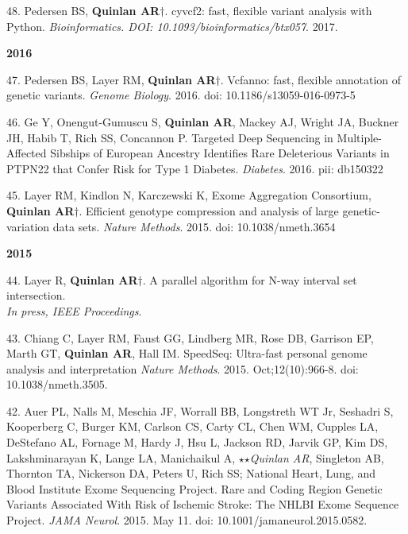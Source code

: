 \documentclass[margin,line]{cv}
\begin{document}
\begin{resume}
\begin{list}{*}{}
    \item[48.] Pedersen BS, \textbf{Quinlan AR}$\dagger$.
    cyvcf2: fast, flexible variant analysis with Python. \emph{Bioinformatics. DOI: 10.1093/bioinformatics/btx057}. 2017. 

    \end{list}


    \textbf{2016} \\

    \begin{list}{*}{}

    \item[47.] Pedersen BS, Layer RM, \textbf{Quinlan AR}$\dagger$.
    Vcfanno: fast, flexible annotation of genetic variants. \emph{Genome Biology}. 2016. doi: 10.1186/s13059-016-0973-5

    \item[46.] Ge Y, Onengut-Gumuscu S, \textbf{Quinlan AR}, Mackey AJ, Wright JA, Buckner JH, Habib T, Rich SS, Concannon P.
    Targeted Deep Sequencing in Multiple-Affected Sibships of European Ancestry Identifies Rare Deleterious Variants in PTPN22 that Confer Risk for Type 1 Diabetes. \emph{Diabetes}. 2016. pii: db150322

    \item[45.] Layer RM, Kindlon N, Karczewski K, Exome Aggregation Consortium, \textbf{Quinlan AR}$\dagger$.
    Efficient genotype compression and analysis of large genetic-variation data sets.
    \emph{Nature Methods}. 2015. doi: 10.1038/nmeth.3654

    \end{list}
    

    \textbf{2015} \\

    \begin{list}{*}{}

    \item[44.] Layer R, \textbf{Quinlan AR}$\dagger$.
    A parallel algorithm for N-way interval set intersection.\\
    \emph{In press, IEEE Proceedings}.

    \item[43.] Chiang C, Layer RM, Faust GG, Lindberg MR, Rose DB, Garrison EP, Marth GT, \textbf{Quinlan AR}, Hall IM.
    SpeedSeq: Ultra-fast personal genome analysis and interpretation
    \emph{Nature Methods}. 2015. Oct;12(10):966-8. doi: 10.1038/nmeth.3505.

    \item[42.] Auer PL, Nalls M, Meschia JF, Worrall BB, Longstreth WT Jr, Seshadri S, Kooperberg C, Burger KM, Carlson CS,
    Carty CL, Chen WM, Cupples LA, DeStefano AL, Fornage M, Hardy J, Hsu L, Jackson RD, Jarvik GP, Kim DS,
    Lakshminarayan K, Lange LA, Manichaikul A,  $\star$$\star$\textit{Quinlan AR}, Singleton AB, Thornton TA,
    Nickerson DA, Peters U, Rich SS; National Heart, Lung, and Blood Institute Exome Sequencing Project.
    Rare and Coding Region Genetic Variants Associated With Risk of Ischemic Stroke: The NHLBI Exome Sequence Project.
    \emph{JAMA Neurol}. 2015. May 11. doi: 10.1001/jamaneurol.2015.0582.


\end{list}
\end{resume}
\end{document}
